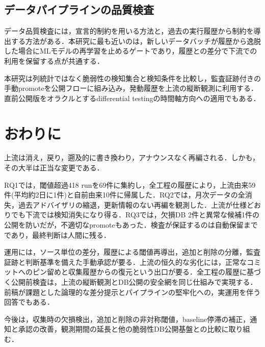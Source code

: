 \documentclass{css}
\begin{document}
\subsection{データパイプラインの品質検査}

データ品質検査には，宣言的制約を用いる方法\cite{schelter18,breck19}と，過去の実行履歴から制約を導出する方法\cite{tu23,redyuk21}がある．本研究に最も近いのは，新しいデータバッチが履歴から逸脱した場合にMLモデルの再学習を止めるゲートであり\cite{shankar23}，履歴との差分で下流での利用を保留する点が共通する．

本研究は列統計ではなく脆弱性の検知集合と検知条件を比較し，監査証跡付きの手動promoteを公開フローに組み込み，発動履歴を上流の縦断観測に利用する．直前公開版をオラクルとするdifferential testing\cite{mckeeman98}の時間軸方向への適用でもある．

\section{おわりに}
\label{sec:conclusion}

上流は消え，戻り，遡及的に書き換わり，アナウンスなく再編される．しかも，その大半は正当な変更である．

RQ1では，閾値超過418 runを69件に集約し，全工程の履歴により，上流由来59件(平均約2日に1件)と自前由来10件に帰属した．RQ2では，月次データの全消失，過去アドバイザリの縮退，更新情報のない再編を観測した．上流が仕様どおりでも下流では検知消失になり得る．RQ3では，欠損DB 2件と異常な候補1件の公開を防いだが，不適切なpromoteもあった．検査が保証するのは自動保留までであり，最終判断は人間に残る．

運用には，ソース単位の差分，履歴による閾値再導出，追加と削除の分離，監査証跡と判断基準を備えた手動承認が要る．上流の恒久的な劣化には，正常なコミットへのピン留めと収集履歴からの復元という出口が要る．全工程の履歴に基づく公開前検査は，上流の縦断観測とDB公開の安全網を同じ仕組みで実現する．前稿が課題とした論理的な差分提示とパイプラインの堅牢化\cite{nakaoka2025}への，実運用を伴う回答でもある．

今後は，収集時の欠損検出，追加と削除の非対称閾値，baseline停滞の補正，通知と承認の改善，観測期間の延長と他の脆弱性DB公開基盤との比較に取り組む．



\end{document}
